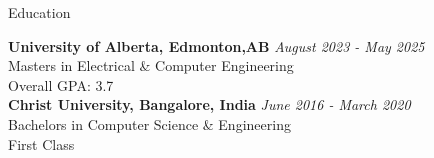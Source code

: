 \documentclass[
	10pt, %
]{resume} %
\begin{document}

\begin{rSection}{Education}
	
	\textbf{University of Alberta, Edmonton,AB} \hfill \textit{August 2023 - May 2025} \\ 
	Masters in Electrical \& Computer Engineering \\
	Overall GPA: 3.7\\
	
	\textbf{Christ University, Bangalore, India}\hfill
	\textit{June 2016 - March 2020}\\
	Bachelors in Computer Science \& Engineering\\
	First Class
	
\end{rSection}

\end{document}

